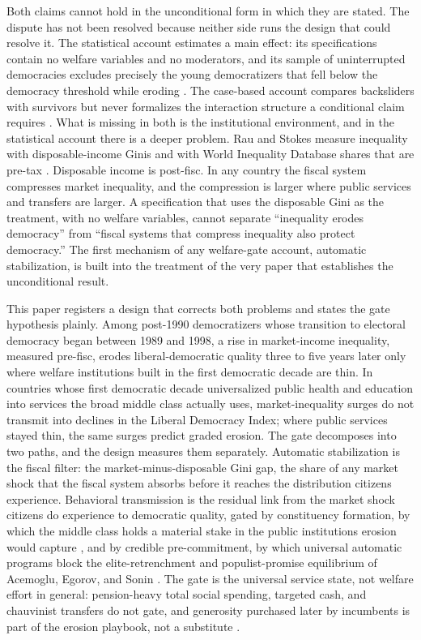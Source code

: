 Both claims cannot hold in the unconditional form in which they are stated. The dispute has not been resolved because neither side runs the design that could resolve it. The statistical account estimates a main effect: its specifications contain no welfare variables and no moderators, and its sample of uninterrupted democracies excludes precisely the young democratizers that fell below the democracy threshold while eroding \citep{RauStokes2025}. The case-based account compares backsliders with survivors but never formalizes the interaction structure a conditional claim requires \citep{HaggardKaufman2021}. What is missing in both is the institutional environment, and in the statistical account there is a deeper problem. Rau and Stokes measure inequality with disposable-income Ginis and with World Inequality Database shares that are pre-tax \citep{RauStokes2025}. Disposable income is post-fisc. In any country the fiscal system compresses market inequality, and the compression is larger where public services and transfers are larger. A specification that uses the disposable Gini as the treatment, with no welfare variables, cannot separate ``inequality erodes democracy'' from ``fiscal systems that compress inequality also protect democracy.'' The first mechanism of any welfare-gate account, automatic stabilization, is built into the treatment of the very paper that establishes the unconditional result.

This paper registers a design that corrects both problems and states the gate hypothesis plainly. Among post-1990 democratizers whose transition to electoral democracy began between 1989 and 1998, a rise in market-income inequality, measured pre-fisc, erodes liberal-democratic quality three to five years later only where welfare institutions built in the first democratic decade are thin. In countries whose first democratic decade universalized public health and education into services the broad middle class actually uses, market-inequality surges do not transmit into declines in the Liberal Democracy Index; where public services stayed thin, the same surges predict graded erosion. The gate decomposes into two paths, and the design measures them separately. Automatic stabilization is the fiscal filter: the market-minus-disposable Gini gap, the share of any market shock that the fiscal system absorbs before it reaches the distribution citizens experience. Behavioral transmission is the residual link from the market shock citizens do experience to democratic quality, gated by constituency formation, by which the middle class holds a material stake in the public institutions erosion would capture \citep{Pierson1993, SossSchram2007, RothsteinUslaner2005}, and by credible pre-commitment, by which universal automatic programs block the elite-retrenchment and populist-promise equilibrium of Acemoglu, Egorov, and Sonin \citep{AcemogluEgorov2013}. The gate is the universal service state, not welfare effort in general: pension-heavy total social spending, targeted cash, and chauvinist transfers do not gate, and generosity purchased later by incumbents is part of the erosion playbook, not a substitute \citep{SzikraOktem2023, LendvaiBainton2021, Vanhuysse2006, Benczes2024, EnnserJedenastik2018}.


